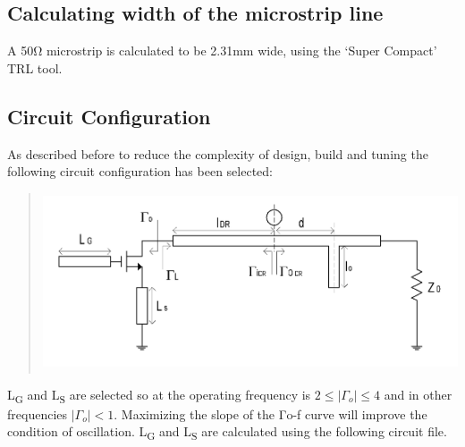 \hypertarget{calculating-width-of-the-microstrip-line}{%
\subsection{\texorpdfstring{ Calculating width of the microstrip
line}{ Calculating width of the microstrip line}}\label{calculating-width-of-the-microstrip-line}}

A 50Ω microstrip is calculated to be 2.31mm wide, using the `Super
Compact' TRL tool.

\hypertarget{circuit-configuration}{%
\subsection{\texorpdfstring{ Circuit
Configuration}{ Circuit Configuration}}\label{circuit-configuration}}

As described before to reduce the complexity of design, build and tuning
the following circuit configuration has been selected:

\begin{quote}
\includegraphics[width=5in,height=2.05556in]{media/image14.png}
\end{quote}

L\textsubscript{G} and L\textsubscript{S} are selected so at the
operating frequency is \(2 \leq \left| \Gamma_{o} \right| \leq 4\) and
in other frequencies \(\left| \Gamma_{o} \right| < 1\). Maximizing the
slope of the Γo-f curve will improve the condition of oscillation.
L\textsubscript{G} and L\textsubscript{S} are calculated using the
following circuit file.

